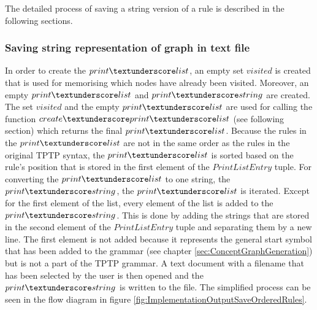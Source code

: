 The detailed process of saving a string version of a rule is described in the following sections.

\subsubsection{Saving string representation of graph in text file}\label{sec:ImplementationOutputSaveGrammarGraphStringRepresentations}

In order to create the $print\textunderscore list$, an empty set $visited$ is created that is used for memorising which nodes have already been visited. Moreover, an empty $print\textunderscore list$ and $print\textunderscore string$ are created. The set $visited$ and the empty $print\textunderscore list$ are used for calling the function $create\textunderscore print\textunderscore list$ (see following section) which returns the final $print\textunderscore list$. Because the rules in the $print\textunderscore list$ are not in the same order as the rules in the original \ac{TPTP} syntax, the $print\textunderscore list$ is sorted based on the rule's position that is stored in the first element of the $PrintListEntry$ tuple. For converting the $print\textunderscore list$ to one string, the $print\textunderscore string$, the $print\textunderscore list$ is iterated. Except for the first element of the list, every element of the list is added to the $print\textunderscore string$. This is done by adding the strings that are stored in the second element of the $PrintListEntry$ tuple and separating them by a new line. The first element is not added because it represents the general start symbol that has been added to the grammar (see chapter \ref{sec:ConceptGraphGeneration}) but is not a part of the \ac{TPTP} grammar. A text document with a filename that has been selected by the user is then opened and the $print\textunderscore string$ is written to the file.
The simplified process can be seen in the flow diagram in figure \ref{fig:ImplementationOutputSaveOrderedRules}.

